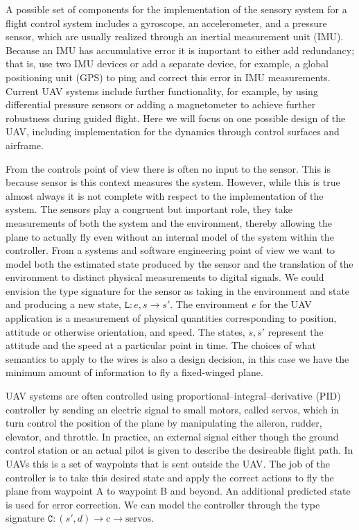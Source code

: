 \documentclass{article}
\begin{document}
A possible set of components for the implementation of the sensory system for a flight control system includes a gyroscope,
an accelerometer, and a pressure sensor, which are usually realized through an inertial measurement unit (IMU).
Because an IMU has accumulative error it is important
to either add redundancy; that is, use two IMU devices or add a separate device, for example, a global positioning unit (GPS) to ping and correct this error in IMU measurements.
Current UAV systems include further functionality,
for example, by using differential pressure sensors
or adding a magnetometer to achieve further robustness
during guided flight.
Here we will focus on one possible design of the UAV,
including implementation for the dynamics through control surfaces
and airframe.

From the controls point of view there is often no input to the sensor.
This is because sensor is this context measures the system.
However, while this is true almost always it is not complete
with respect to the implementation of the system.
The sensors play a congruent but important role,
they take measurements of both the system
and the environment, thereby allowing the plane to actually fly
even without an internal model of the system within the controller.
From a systems and software engineering point of view we want to model both
the estimated state produced by the sensor and the translation
of the environment to distinct physical measurements
to digital signals.
We could envision the type signature for the sensor as
taking in the environment and state and producing a new state,
\(\mathtt{L}: e, s \rightarrow s'\).
The environment \(e\) for the UAV application is a measurement
of physical quantities corresponding to position, attitude or otherwise orientation, and speed.
The states, \(s, s'\) represent the attitude and the speed at a particular point in time.
The choices of what semantics to apply
to the wires is also a design decision, in this case we have the minimum amount
of information to fly a fixed-winged plane.

UAV systems are often controlled using proportional--integral--derivative (PID) controller by sending an electric signal to small motors, called servos, which in turn control the position of the plane by manipulating the aileron, rudder, elevator, and throttle. In practice, an external signal either though the ground control station or an actual pilot is given to describe the desireable flight path. In UAVs this is a set of waypoints that is sent outside the UAV. The job of the controller is to take this desired state and apply the correct actions to fly the plane from waypoint A to waypoint B and beyond. An additional predicted state is used for error correction. We can model the controller through the type signature \(\mathtt{C}: (s', d) \rightarrow \text{c} \rightarrow \text{servos.}\)
\end{document}
